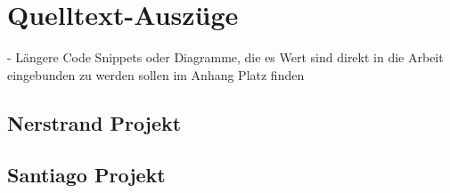 
\chapter{Quelltext-Auszüge} %
\label{cha:quelltext_auszuege}

  - Längere Code Snippets oder Diagramme, die es Wert sind direkt in die Arbeit eingebunden zu werden sollen im Anhang Platz finden
  
\section{Nerstrand Projekt} %
\label{sec:nerstrand_projekt}


\section{Santiago Projekt} %
\label{sec:santiago_projekt}

